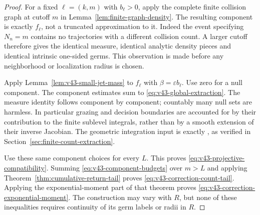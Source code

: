 \begin{proof}
For a fixed $\ell=(k,m)$ with $b_\ell>0$, apply the complete finite
collision graph at cutoff $m$ in Lemma~\ref{lem:finite-graph-density}.
The resulting component is exactly $f_\ell$, not a truncated
approximation to it. Indeed the event specifying $N_n=m$ contains
no trajectories with a different collision count. A larger cutoff
therefore gives the identical measure, identical analytic density
pieces and identical intrinsic one-sided germs. This observation is
made before any neighborhood or localization radius is chosen.

Apply Lemma~\ref{lem:v43-small-jet-mass} to $f_\ell$ with
$\beta=\varepsilon b_\ell$. Use zero for a null component. The
component estimates sum to \eqref{eq:v43-global-extraction}.
The measure identity follows component by component; countably many
null sets are harmless. In particular grazing and decision boundaries
are accounted for by their contribution to the finite sublevel
integrals, rather than by a smooth extension of their inverse Jacobian.
The geometric integration input is exactly
\cite[Theorem 1.3 and Theorem 3.11]{CMInt}, as verified in
Section~\ref{sec:finite-count-extraction}.

Use these same component choices for every $L$. This proves
\eqref{eq:v43-projective-compatibility}. Summing
\eqref{eq:v43-component-budgets} over $m>L$ and applying
Theorem~\ref{thm:cumulative-return-tail} proves
\eqref{eq:v43-correction-count-tail}. Applying the exponential-moment
part of that theorem proves \eqref{eq:v43-correction-exponential-moment}.
The construction may vary with $R$, but none of these inequalities
requires continuity of its germ labels or radii in $R$.
\end{proof}

